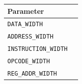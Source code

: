 \begin{table}
    \centering
    
    
    \begin{tabular}{@{}ll@{}}
        \toprule
        Parameter  \\
        \midrule
        \texttt{DATA\_WIDTH}  \\
        \texttt{ADDRESS\_WIDTH}  \\
        \texttt{INSTRUCTION\_WIDTH} \\
        \texttt{OPCODE\_WIDTH}  \\
        \texttt{REG\_ADDR\_WIDTH}  \\
        \bottomrule
    \end{tabular}
\end{table}